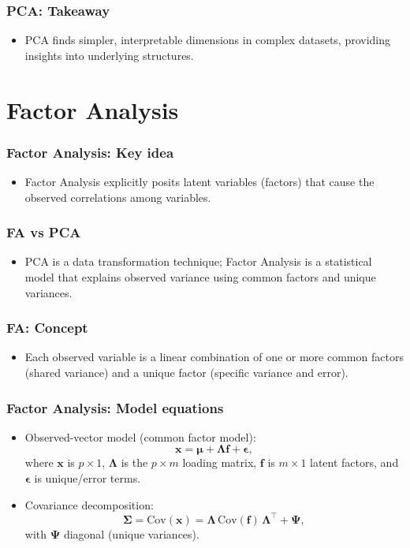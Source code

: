 \documentclass{beamer}
\begin{document}
\begin{frame}
    \frametitle{PCA: Takeaway}
    \begin{itemize}
        \item PCA finds simpler, interpretable dimensions in complex datasets, providing insights into underlying structures.
    \end{itemize}
\end{frame}

\section{Factor Analysis}

\begin{frame}
    \frametitle{Factor Analysis: Key idea}
    \begin{itemize}
        \item Factor Analysis explicitly posits \alert{latent variables} (factors) that cause the observed correlations among variables.
    \end{itemize}
\end{frame}

\begin{frame}
    \frametitle{FA vs PCA}
    \begin{itemize}
        \item PCA is a data transformation technique; Factor Analysis is a statistical model that explains observed variance using common factors and unique variances.
    \end{itemize}
\end{frame}

\begin{frame}
    \frametitle{FA: Concept}
    \begin{itemize}
        \item Each observed variable is a linear combination of one or more common factors (shared variance) and a unique factor (specific variance and error).
    \end{itemize}
\end{frame}

\begin{frame}
    \frametitle{Factor Analysis: Model equations}
    \begin{itemize}
        \item Observed-vector model (common factor model):
        \[\mathbf{x}=\boldsymbol{\mu}+\mathbf{\Lambda}\mathbf{f}+\boldsymbol{\epsilon},\]
        where $\mathbf{x}$ is $p\times 1$, $\mathbf{\Lambda}$ is the $p\times m$ loading matrix, $\mathbf{f}$ is $m\times1$ latent factors, and $\boldsymbol{\epsilon}$ is unique/error terms.
        \item Covariance decomposition:
        \[\boldsymbol{\Sigma}=\mathrm{Cov}(\mathbf{x})=\mathbf{\Lambda}\,\mathrm{Cov}(\mathbf{f})\,\mathbf{\Lambda}^\top+\boldsymbol{\Psi},\]
        with $\boldsymbol{\Psi}$ diagonal (unique variances).
    \end{itemize}
\end{frame}
\end{document}
